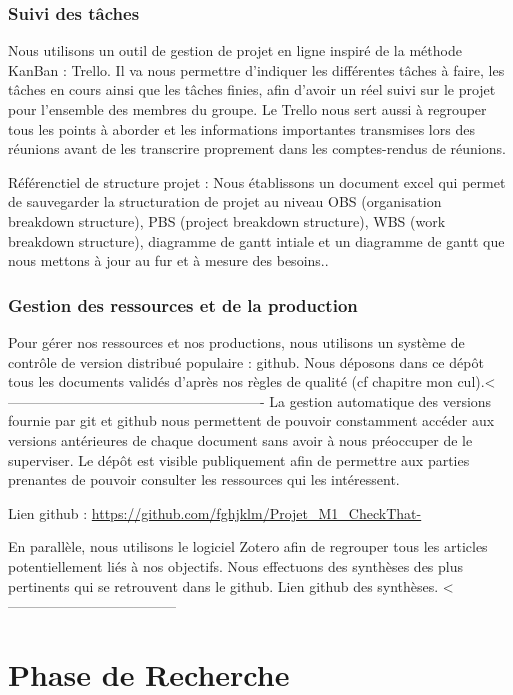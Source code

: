 \documentclass[11pt]{rapport_class}
\begin{document}
\subsection{Suivi des tâches}
\qquad Nous utilisons un outil de gestion de projet en ligne inspiré de la méthode KanBan : Trello. Il va nous permettre d’indiquer les différentes tâches à faire, les tâches en cours ainsi que les tâches finies, afin d’avoir un réel suivi sur le projet pour l’ensemble des membres du groupe. Le Trello nous sert aussi à regrouper tous les points à aborder et les informations importantes transmises lors des réunions avant de les transcrire proprement dans les comptes-rendus de réunions.

Référenctiel de structure projet : Nous établissons un document excel qui permet de sauvegarder la structuration de projet au niveau OBS (organisation breakdown structure), PBS (project breakdown structure), WBS (work breakdown structure), diagramme de gantt intiale et un diagramme de gantt que nous mettons à jour au fur et à mesure des besoins..

\subsection{Gestion des ressources et de la production}
\qquad Pour gérer nos ressources et nos productions, nous utilisons un système de contrôle de version distribué populaire : github. Nous déposons dans ce dépôt tous les documents validés d'après nos règles de qualité (cf chapitre mon cul).<------------------------------------------------------- La gestion automatique des versions fournie par git et github nous permettent de pouvoir constamment accéder aux versions antérieures de chaque document sans avoir à nous préoccuper de le superviser. Le dépôt est visible publiquement afin de permettre aux parties prenantes de pouvoir consulter les ressources qui les intéressent.

Lien github : \url{https://github.com/fghjklm/Projet_M1_CheckThat-}

En parallèle, nous utilisons le logiciel Zotero afin de regrouper tous les articles potentiellement liés à nos objectifs. Nous effectuons des synthèses des plus pertinents qui se retrouvent dans le github.
Lien github des synthèses. <------------------------------------

\chapter{Phase de Recherche}
\end{document}
